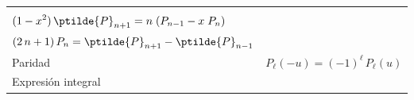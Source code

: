 \begin{table}[H]
\begin{tabular}{| p{5cm} | p{12cm} |}
{\( \displaystyle \ptilde{P}_{n-1} = -n \; P_{n} + x \; \ptilde{P}_{n}\) \\
\( \displaystyle (1 - x^{2}) \, \ptilde{P}_{n+1} = n \; (P_{n-1} - x \; P_{n})\) \\
\( \displaystyle (2 \, n + 1) \, P_{n} = \ptilde{P}_{n+1} - \ptilde{P}_{n-1} \)} \\ \hline
Paridad & \( \displaystyle P_{\ell} (-u) = (-1)^{\ell} \, P_{\ell} (u) \) \\ \hline
Expresión integral & \\ \hline
\end{tabular}
\end{table}
